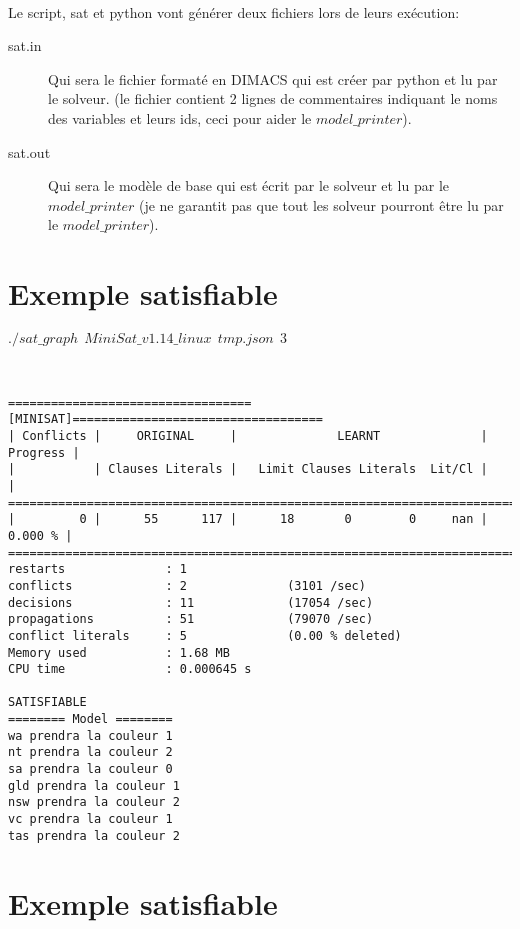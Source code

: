 \documentclass[french, 12pt]{report}
\newcommand{\formula}[1]{
\begin{center}
{#1}
\end{center}
}
\begin{document}
\ \\
Le script, sat et python vont générer deux fichiers lors de leurs exécution:

\begin{description}
\item[sat.in] Qui sera le fichier formaté en DIMACS qui est créer par python et lu par le solveur. (le fichier contient 2 lignes de commentaires indiquant le noms des variables et leurs ids, ceci pour aider le $model\_printer$).
\item[sat.out] Qui sera le modèle de base qui est écrit par le solveur et lu par le $model\_printer$ (je ne garantit pas que tout les solveur pourront être lu par le $model\_printer$).
\end{description}

\pagebreak
\section{Exemple satisfiable}

\formula{$./sat\_graph\ \ MiniSat\_v1.14\_linux\ \ tmp.json\ \ 3$}
\ \\
\begin{lstlisting}
==================================[MINISAT]===================================
| Conflicts |     ORIGINAL     |              LEARNT              | Progress |
|           | Clauses Literals |   Limit Clauses Literals  Lit/Cl |          |
==============================================================================
|         0 |      55      117 |      18       0        0     nan |  0.000 % |
==============================================================================
restarts              : 1
conflicts             : 2              (3101 /sec)
decisions             : 11             (17054 /sec)
propagations          : 51             (79070 /sec)
conflict literals     : 5              (0.00 % deleted)
Memory used           : 1.68 MB
CPU time              : 0.000645 s

SATISFIABLE
======== Model ========
wa prendra la couleur 1
nt prendra la couleur 2
sa prendra la couleur 0
gld prendra la couleur 1
nsw prendra la couleur 2
vc prendra la couleur 1
tas prendra la couleur 2

\end{lstlisting}

\pagebreak
\section{Exemple satisfiable}
\end{document}
